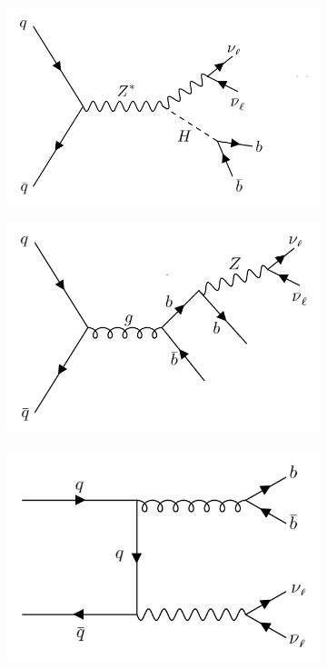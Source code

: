 \documentclass[10pt,a4paper]{book}
\begin{document}
\begin{figure}
\begin{subfigure}{.5\textwidth}
\centering
\includegraphics[scale=0.6]{ch4_images/zhbb}
\caption{}
\end{subfigure}
\begin{subfigure}{.5\textwidth}
\centering
\includegraphics[scale=0.15]{ch4_images/gbb1}
\caption{}
\end{subfigure}
\begin{subfigure}{.5\textwidth}
\centering
\includegraphics[scale=0.15]{ch4_images/gbb2}

\end{subfigure}
\end{figure}
\end{document}
